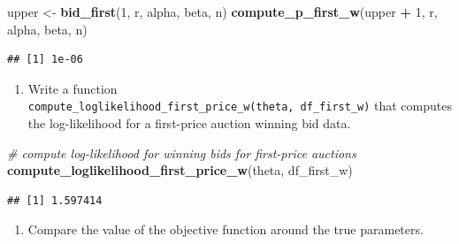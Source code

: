 \documentclass[]{book}
\newenvironment{Shaded}{\begin{snugshade}}{\end{snugshade}}
\newcommand{\KeywordTok}[1]{\textcolor[rgb]{0.13,0.29,0.53}{\textbf{#1}}}
\newcommand{\DecValTok}[1]{\textcolor[rgb]{0.00,0.00,0.81}{#1}}
\newcommand{\StringTok}[1]{\textcolor[rgb]{0.31,0.60,0.02}{#1}}
\newcommand{\CommentTok}[1]{\textcolor[rgb]{0.56,0.35,0.01}{\textit{#1}}}
\newcommand{\OperatorTok}[1]{\textcolor[rgb]{0.81,0.36,0.00}{\textbf{#1}}}
\newcommand{\NormalTok}[1]{#1}
\providecommand{\tightlist}{%
  \setlength{\itemsep}{0pt}\setlength{\parskip}{0pt}}
\begin{document}
\begin{Shaded}
\begin{Highlighting}[]
\NormalTok{upper <-}\StringTok{ }\KeywordTok{bid_first}\NormalTok{(}\DecValTok{1}\NormalTok{, r, alpha, beta, n)}
\KeywordTok{compute_p_first_w}\NormalTok{(upper }\OperatorTok{+}\StringTok{ }\DecValTok{1}\NormalTok{, r, alpha, beta, n)}
\end{Highlighting}
\end{Shaded}

\begin{verbatim}
## [1] 1e-06
\end{verbatim}

\begin{enumerate}
\def\labelenumi{\arabic{enumi}.}
\setcounter{enumi}{6}
\tightlist
\item
  Write a function
  \texttt{compute\_loglikelihood\_first\_price\_w(theta,\ df\_first\_w)}
  that computes the log-likelihood for a first-price auction winning bid
  data.
\end{enumerate}

\begin{Shaded}
\begin{Highlighting}[]
\CommentTok{# compute log-likelihood for winning bids for first-price auctions}
\KeywordTok{compute_loglikelihood_first_price_w}\NormalTok{(theta, df_first_w)}
\end{Highlighting}
\end{Shaded}

\begin{verbatim}
## [1] 1.597414
\end{verbatim}

\begin{enumerate}
\def\labelenumi{\arabic{enumi}.}
\setcounter{enumi}{7}
\tightlist
\item
  Compare the value of the objective function around the true
  parameters.
\end{enumerate}
\end{document}
